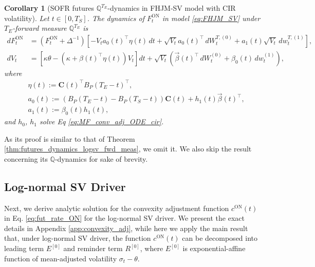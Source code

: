 \documentclass[pdftex,11pt,a4paper] {article}
\newtheorem{corollary}{Corollary}[section]
\begin{document}
\begin{corollary}[SOFR futures $\mathbb{Q}^{T_E}$-dynamics in FHJM-SV model with CIR volatility]\label{thm:futures_dynamics_cir_fwd_meas}
Let $t\in[0, T_S]$. The dynamics of $ F^{\mathrm{ON}}_t$ in model \eqref{eq:FHJM_SV} under $T_E$-forward measure $\mathbb{Q}^{T_E}$ is 
\begin{equation}\label{eq:futures_fwd_cir}
\begin{split}
d F^{\mathrm{ON}}_t&=\left( F^{\mathrm{ON}}_t+\Delta^{-1}\right)\left[-V_ta_0(t)^\top\eta(t)\,dt + \sqrt{V_t} a_0(t)^\top\,dW^{T, (0)}_t+ a_1(t)\sqrt{V_t}\,dw^{T, (1)}_t\right], \\
dV_{t}&=\left[\kappa\theta-\left(\kappa+\beta(t)^\top \eta(t)\right)V_t\right]dt + \sqrt{V_{t}} \left(\vec{\beta}(t)^\top\,dW^{(0)}_t+\beta_{0}(t)\,dw^{(1)}_t\right),
\end{split}
\end{equation}
where 
\begin{equation}\label{eq:futures_coeffs_a2}
\begin{split}
&\eta(t):=\mathbf{C}(t)^\top B_P(T_E-t)^\top,\\
&a_0(t):=(B_P(T_E-t)-B_P(T_S-t))\mathbf{C}(t)+h_1(t)\vec{\beta}(t)^\top,\\
&a_1(t):=\beta_0(t)h_1(t),
\end{split}
\end{equation}
and $h_0$, $h_1$ solve Eq \eqref{eq:MF_conv_adj_ODE_cir}.

\end{corollary}
As its proof is similar to that of Theorem \ref{thm:futures_dynamics_logsv_fwd_meas}, we omit it. We also skip the result concerning its $\mathbb{Q}$-dynamics for sake of brevity. 



\subsection{Log-normal SV Driver}

Next, we derive analytic solution for the convexity adjustment function $c^{\mathrm{ON}}(t)$ in Eq. \eqref{eq:fut_rate_ON} for the log-normal SV driver. We present the exact details in Appendix \ref{app:convexity_adj}, while here we apply the main result that, under log-normal SV driver, the function $c^{\mathrm{ON}}(t)$ can be decomposed into leading term $E^{[0]}$ and reminder term $R^{[0]}$, where $E^{[0]}$ is exponential-affine function of mean-adjusted volatility $\sigma_t-\theta$.
\end{document}
